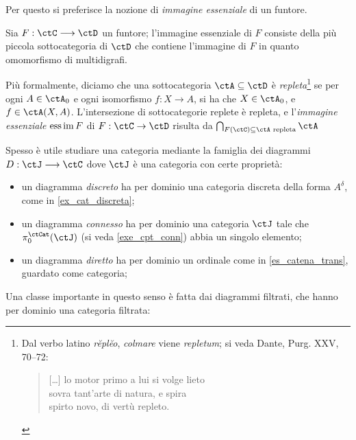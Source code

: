Per questo si preferisce la nozione di \emph{immagine essenziale} di un funtore.
\begin{definition}\label{def_fun_imess}
	Sia \(F : \ctC\fun\ctD\) un funtore; l'immagine essenziale di \(F\) consiste della più piccola sottocategoria di \(\ctD\) che contiene l'immagine di \(F\) in quanto omomorfismo di multidigrafi.

	Più formalmente, diciamo che una sottocategoria \(\ctA\subseteq\ctD\) è \emph{repleta}\footnote{Dal verbo latino \emph{rĕplĕo}, \emph{colmare} viene \emph{repletum}; si veda Dante, Purg. XXV, 70--72:
		\begin{verse}
			[\dots\unkern] lo motor primo a lui si volge lieto \\
			sovra tant'arte di natura, e spira \\
			spirto novo, di vertù repleto.
		\end{verse}} se per ogni \(A\in\ctA_0\) e ogni isomorfismo \(f : X\to A\), si ha che \(X\in\ctA_0\), e \(f \in \Hom\ctA(X,A)\). L'intersezione di sottocategorie replete è repleta, e l'\emph{immagine essenziale} \(\operatorname*{ess\,im} F\) di \(F : \ctC\to\ctD\) risulta da \(\bigcap_{F(\ctC)\subseteq \ctA \text{ repleta}} \ctA\)
\end{definition}
Spesso è utile studiare una categoria mediante la famiglia dei diagrammi \(D : \ctJ \fun\ctC\) dove \(\ctJ\) è una categoria con certe proprietà:
\begin{itemize}
	\item un diagramma \emph{discreto} ha per dominio una categoria discreta della forma \(A^\delta\), come in \ref{ex_cat_discreta};
	\item un diagramma \emph{connesso} ha per dominio una categoria \(\ctJ\) tale che \(\pi_0^\ctCat(\ctJ)\) (si veda \ref{exe_cpt_conn}) abbia un singolo elemento;
	\item un diagramma \emph{diretto} ha per dominio un ordinale come in \ref{es_catena_trans}, guardato come categoria;
\end{itemize}
Una classe importante in questo senso è fatta dai diagrammi filtrati, che hanno per dominio una categoria filtrata:
